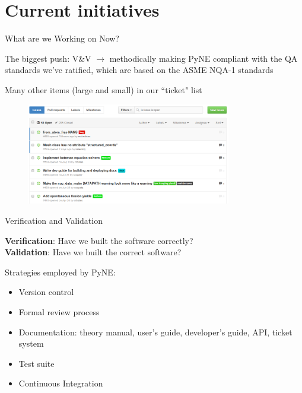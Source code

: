 \documentclass[xcolor=x11names,compress]{beamer}
\renewcommand{\(}{\begin{columns}}
\renewcommand{\)}{\end{columns}}
\newcommand{\<}[1]{\begin{column}{#1}}
\renewcommand{\>}{\end{column}}
\begin{document}
\section{Current initiatives}
\begin{frame}{What are we Working on Now?}

    The biggest push: \textcolor{dgreen}{V\&V} $\rightarrow$ methodically making PyNE compliant 
    with the QA standards we've ratified, which are based on the ASME NQA-1 standards
    \cite{pyne_vnv}

    \vspace*{1 em}
    Many other items (large and small) in our ``ticket" list
    
    \begin{center}
 	\begin{figure}
 	\includegraphics[height=1.75in,clip]{../figs/PyNE-tickets}
    \end{figure}
 	\end{center}
    
\end{frame}

\begin{frame}{Verification and Validation}

    \textbf{Verification}: Have we built the software correctly?\\
    \textbf{Validation}: Have we built the correct software?
    
    \vspace*{1 em}
    Strategies employed by PyNE:
   
    \begin{itemize}
    \item Version control
    \item Formal review process
    \item Documentation: theory manual, user's guide, developer's guide, API, 
    ticket system
    \item Test suite
    \item Continuous Integration
    \end{itemize}

\end{frame}
\end{document}
